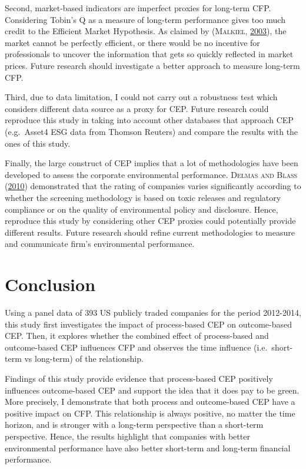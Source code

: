 \documentclass[12pt,]{article}
\begin{document}
Second, market-based indicators are imperfect proxies for long-term CFP.
Considering Tobin's Q as a measure of long-term performance gives too
much credit to the Efficient Market Hypothesis. As claimed by
(\textsc{Malkiel}, \protect\hyperlink{ref-Malkiel2003}{2003}), the
market cannot be perfectly efficient, or there would be no incentive for
professionals to uncover the information that gets so quickly reflected
in market prices. Future research should investigate a better approach
to measure long-term CFP.

Third, due to data limitation, I could not carry out a robustness test
which considers different data source as a proxy for CEP. Future
research could reproduce this study in taking into account other
databases that approach CEP (e.g.~Asset4 ESG data from Thomson Reuters)
and compare the results with the ones of this study.

Finally, the large construct of CEP implies that a lot of methodologies
have been developed to assess the corporate environmental performance.
\textsc{Delmas and Blass} (\protect\hyperlink{ref-Delmas2010}{2010})
demonstrated that the rating of companies varies significantly according
to whether the screening methodology is based on toxic releases and
regulatory compliance or on the quality of environmental policy and
disclosure. Hence, reproduce this study by considering other CEP proxies
could potentially provide different results. Future research should
refine current methodologies to measure and communicate firm's
environmental performance.

\FloatBarrier
\newpage
{}

\section*{Conclusion}\label{conclusion}

Using a panel data of 393 US publicly traded companies for the period
2012-2014, this study first investigates the impact of process-based CEP
on outcome-based CEP. Then, it explores whether the combined effect of
process-based and outcome-based CEP influences CFP and observes the time
influence (i.e.~short-term vs long-term) of the relationship.

Findings of this study provide evidence that process-based CEP
positively influences outcome-based CEP and support the idea that it
does pay to be green. More precisely, I demonstrate that both process
and outcome-based CEP have a positive impact on CFP. This relationship
is always positive, no matter the time horizon, and is stronger with a
long-term perspective than a short-term perspective. Hence, the results
highlight that companies with better environmental performance have also
better short-term and long-term financial performance.
\end{document}
